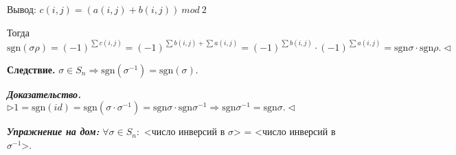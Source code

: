 Вывод: $c(i,j) = (a(i,j) + b(i,j))\ mod\ 2$

Тогда $\mathrm{sgn}(\sigma \rho) = (-1)^{\sum c(i,j)} = (-1)^{\sum b(i,j) + \sum a(i,j)} = (-1)^{\sum b(i,j)} \cdot (-1)^{\sum a(i,j)} = \mathrm{sgn} \sigma \cdot \mathrm{sgn} \rho. \lhd$

\bigskip
\textbf{Следствие.} $\sigma \in S_n \Rightarrow \mathrm{sgn} (\sigma^{-1}) = \mathrm{sgn}(\sigma)$.

\bigskip
\textbf{\textit{Доказательство.}} $\rhd 1 = \mathrm{sgn}(id) = \mathrm{sgn}(\sigma \cdot \sigma^{-1}) = \mathrm{sgn} \sigma \cdot \mathrm{sgn} \sigma^{-1} \Rightarrow \mathrm{sgn} \sigma^{-1} = \mathrm{sgn} \sigma. \lhd$

\bigskip
\textbf{\textit{Упражнение на дом:}} $\forall \sigma \in S_n:$ <число инверсий в $\sigma$> = <число инверсий в $\sigma^{-1}$>.

